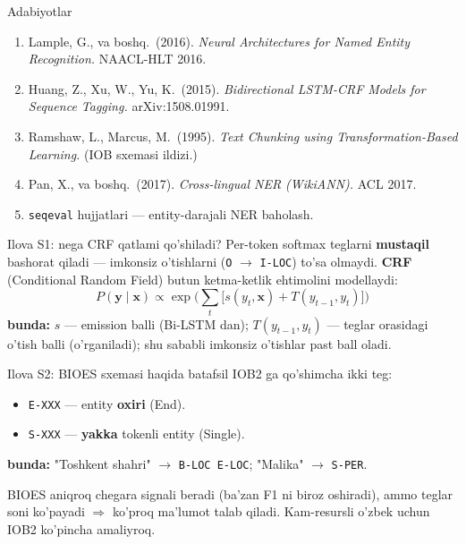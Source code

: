 \documentclass[aspectratio=169,11pt]{beamer}
\newcommand{\bunda}[1]{{\small\textbf{bunda:}\; #1}}
\begin{document}
\begin{frame}{Adabiyotlar}
  \begin{enumerate}\small\setlength\itemsep{5pt}
    \item Lample, G., va boshq.\ (2016). \textit{Neural Architectures for Named Entity
          Recognition.} NAACL-HLT 2016.
    \item Huang, Z., Xu, W., Yu, K.\ (2015). \textit{Bidirectional LSTM-CRF Models for
          Sequence Tagging.} arXiv:1508.01991.
    \item Ramshaw, L., Marcus, M.\ (1995). \textit{Text Chunking using
          Transformation-Based Learning.} (IOB sxemasi ildizi.)
    \item Pan, X., va boshq.\ (2017). \textit{Cross-lingual NER (WikiANN).} ACL 2017.
    \item \texttt{seqeval} hujjatlari --- entity-darajali NER baholash.
  \end{enumerate}
\end{frame}

\appendix

\begin{frame}{Ilova S1: nega CRF qatlami qo'shiladi?}
  \small
  Per-token softmax teglarni \textbf{mustaqil} bashorat qiladi --- imkonsiz o'tishlarni
  (\texttt{O} $\to$ \texttt{I-LOC}) to'sa olmaydi. \textbf{CRF} (Conditional Random Field)
  butun ketma-ketlik ehtimolini modellaydi:
  $$ P(\mathbf{y}\mid\mathbf{x}) \propto \exp\Big(\sum_t \big[s(y_t,\mathbf{x}) + T(y_{t-1},y_t)\big]\Big) $$
  \bunda{$s$ --- emission balli (Bi-LSTM dan); $T(y_{t-1},y_t)$ --- teglar orasidagi
  o'tish balli (o'rganiladi); shu sababli imkonsiz o'tishlar past ball oladi.}
\end{frame}

\begin{frame}{Ilova S2: BIOES sxemasi haqida batafsil}
  \small
  IOB2 ga qo'shimcha ikki teg:
  \begin{itemize}\setlength\itemsep{2pt}
    \item \texttt{E-XXX} --- entity \textbf{oxiri} (End).
    \item \texttt{S-XXX} --- \textbf{yakka} tokenli entity (Single).
  \end{itemize}
  \bunda{"Toshkent shahri" $\to$ \texttt{B-LOC E-LOC}; "Malika" $\to$ \texttt{S-PER}.}
  \vspace{4pt}

  BIOES aniqroq chegara signali beradi (ba'zan F1 ni biroz oshiradi), ammo teglar soni
  ko'payadi $\Rightarrow$ ko'proq ma'lumot talab qiladi. Kam-resursli o'zbek uchun IOB2
  ko'pincha amaliyroq.
\end{frame}
\end{document}
